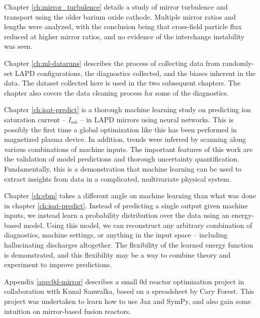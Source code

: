 Chapter \ref{ch:mirror_turbulence} details a study of mirror turbulence and transport using the older barium oxide cathode. Multiple mirror ratios and lengths were analyzed, with the conclusion being that cross-field particle flux reduced at higher mirror ratios, and no evidence of the interchange instability was seen.

Chapter \ref{ch:ml-dataruns} describes the process of collecting data from randomly-set LAPD configurations, the diagnostics collected, and the biases inherent in the data. The dataset collected here is used in the two subsequent chapters. The chapter also covers the data cleaning process for some of the diagnostics. 

Chapter \ref{ch:isat-predict} is a thorough machine learning study on predicting ion saturation current -- $I_\text{sat}$ -- in LAPD mirrors using neural networks. This is possibly the first time a global optimization like this has been performed in magnetized plasma device. In addition, trends were inferred by scanning along various combinations of machine inputs. The important features of this work are the validation of model predictions and thorough uncertainty quantification. Fundamentally, this is a demonstration that machine learning can be used to extract insights from data in a complicated, multivariate physical system. 

Chapter \ref{ch:ebm} takes a different angle on machine learning than what was done in chapter \ref{ch:isat-predict}. Instead of predicting a single output given machine inputs, we instead learn a probability distribution over the data using an energy-based model. Using this model, we can reconstruct any arbitrary combination of diagnostics, machine settings, or anything in the input space -- including hallucinating discharges altogether. The flexibility of the learned energy function is demonstrated, and this flexibility may be a way to combine theory and experiment to improve predictions. 

Appendix \ref{app:0d-mirror} describes a small 0d reactor optimization project in collaboration with Kunal Sanwalka, based on a spreadsheet by Cary Forest. This project was undertaken to learn how to use Jax and SymPy, and also gain some intuition on mirror-based fusion reactors.
